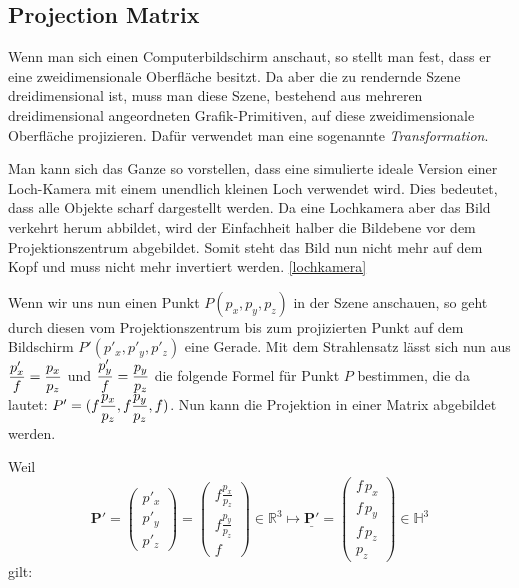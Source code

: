 \subsection{Projection Matrix}
\label{Sec:Projection}
Wenn man sich einen Computerbildschirm anschaut, so stellt man fest, dass er eine zweidimensionale Oberfläche besitzt. 
Da aber die zu rendernde Szene dreidimensional ist, muss man diese Szene, bestehend aus mehreren dreidimensional angeordneten Grafik-Primitiven, auf diese zweidimensionale Oberfläche projizieren. Dafür verwendet man eine sogenannte \textit{Transformation}.

Man kann sich das Ganze so vorstellen, dass eine simulierte ideale Version einer Loch-Kamera mit einem unendlich kleinen Loch verwendet wird. Dies bedeutet, dass alle Objekte scharf dargestellt werden. Da eine Lochkamera aber das Bild verkehrt herum abbildet, wird der Einfachheit halber die Bildebene vor dem Projektionszentrum abgebildet. Somit steht das Bild nun nicht mehr auf dem Kopf und muss nicht mehr invertiert werden. \cref{lochkamera}

Wenn wir uns nun einen Punkt $P(p_{x}, p_{y}, p_{z})$ in der Szene anschauen, so geht durch diesen vom Projektionszentrum bis zum projizierten Punkt auf dem Bildschirm $P'(p'_{x}, p'_{y}, p'_{z})$ eine Gerade. Mit dem Strahlensatz lässt sich nun aus $\dfrac{p'_{x}}{\mathnormal{f}} = \dfrac{p_{x}}{p_{z}} $ und $ \dfrac{p'_{y}}{\mathnormal{f}} = \dfrac{p_{y}}{p_{z}} $ die folgende Formel für Punkt $P$ bestimmen, die da lautet: $P'=(\mathnormal{f}\dfrac{p_{x}}{p_{z}}, \mathnormal{f}\dfrac{p_{y}}{p_{z}}, \mathnormal{f})$.
Nun kann die Projektion in einer Matrix abgebildet werden.

Weil $$\mathbf{P'}= \begin{pmatrix} p'_x \\ p'_y \\ p'_z \end{pmatrix}= \begin{pmatrix} f
\frac{p_x}{p_z}\\ f \frac{p_y}{p_z}\\ f \end{pmatrix} \in \mathbb{R}^3 \longmapsto \underline{\mathbf{P'}}= \begin{pmatrix}f \, p_x \\f \, p_y \\ f \, p_z\\
p_z\end{pmatrix} \in \mathbb{H}^3 $$
gilt:	


